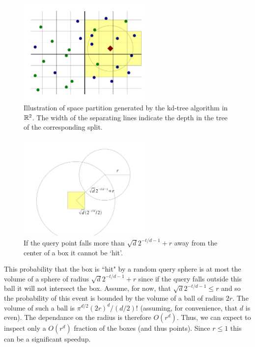 \documentclass{article}
\begin{document}
\begin{figure}[h!]
  \centering
  \includegraphics[width=0.6\textwidth]{10_images/nns_simple.pdf}
  \caption{Illustration of space partition generated by the kd-tree algorithm in ${\mathbb{R}}^2$. 
  The width of the separating lines indicate the depth in the tree of the corresponding split.}
\end{figure}


\begin{figure}[h!]
  \centering
  \includegraphics[width=0.6\textwidth]{10_images/radii.pdf}
  \caption{If the query point falls more than $\sqrt{d}2^{-t/d-1} + r$ away from the center of a 
  box it cannot be `hit'.}
\end{figure}

This probability that the box is ``hit" by a random query sphere 
is at most the volume of a sphere of radius $\sqrt{d}2^{-t/d-1} + r$ since 
if the query falls outside this ball it will not intersect the box. Assume, for now, that $\sqrt{d}2^{-t/d-1} \le r$ and
so the probability of this event is bounded by the volume of a ball of radius $2r$.
The volume of such a ball is $\pi^{d/2}(2r)^d/(d/2)!$ (assuming, for convenience, that $d$ is even).
The dependance on the radius is therefore $O(r^d)$. Thus, we can expect to inspect only a $O(r^d)$ fraction of the 
boxes (and thus points). Since $r\le 1$ this can be a significant speedup.
\end{document}

